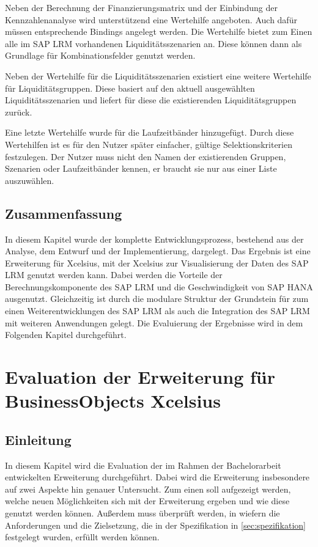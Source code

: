 \begin{onehalfspacing}
Neben der Berechnung der Finanzierungsmatrix und der Einbindung der Kennzahlenanalyse wird unterstützend eine Wertehilfe angeboten. Auch dafür müssen entsprechende Bindings angelegt werden. Die Wertehilfe bietet zum Einen alle im SAP LRM vorhandenen Liquiditätsszenarien an. Diese können dann als Grundlage für Kombinationsfelder genutzt werden.

Neben der Wertehilfe für die Liquiditätsszenarien existiert eine weitere Wertehilfe für Liquiditätsgruppen. Diese basiert auf den aktuell ausgewählten Liquiditätsszenarien und liefert für diese die existierenden Liquiditätsgruppen zurück.

Eine letzte Wertehilfe wurde für die Laufzeitbänder hinzugefügt. Durch diese Wertehilfen ist es für den Nutzer später einfacher, gültige Selektionskriterien festzulegen. Der Nutzer muss nicht den Namen der existierenden Gruppen, Szenarien oder Laufzeitbänder kennen, er braucht sie nur aus einer Liste auszuwählen.

\section{Zusammenfassung}
In diesem Kapitel wurde der komplette Entwicklungsprozess, bestehend aus der Analyse, dem Entwurf und der Implementierung, dargelegt. Das Ergebnis ist eine Erweiterung für Xcelsius, mit der Xcelsius zur Visualisierung der Daten des SAP LRM genutzt werden kann. Dabei werden die Vorteile der Berechnungskomponente des SAP LRM und die Geschwindigkeit von SAP HANA ausgenutzt. Gleichzeitig ist durch die modulare Struktur der Grundstein für zum einen Weiterentwicklungen des SAP LRM als auch die Integration des SAP LRM mit weiteren Anwendungen gelegt. Die Evaluierung der Ergebnisse wird in dem Folgenden Kapitel durchgeführt.

\chapter{Evaluation der Erweiterung für BusinessObjects Xcelsius}

\section{Einleitung}
In diesem Kapitel wird die Evaluation der im Rahmen der Bachelorarbeit entwickelten Erweiterung durchgeführt. Dabei wird die Erweiterung insbesondere auf zwei Aspekte hin genauer Untersucht. Zum einen soll aufgezeigt werden, welche neuen Möglichkeiten sich mit der Erweiterung ergeben und wie diese genutzt werden können. Außerdem muss überprüft werden, in wiefern die Anforderungen und die Zielsetzung, die in der Spezifikation in \vref{sec:spezifikation} festgelegt wurden, erfüllt werden können.


\end{onehalfspacing}
